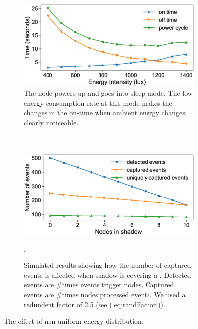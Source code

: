 \begin{figure}
	\begin{subfigure}{0.49\columnwidth}
		\includegraphics[width=\textwidth]{figures/BatterylessNodesDutyCycles_Sleep_mode}
		\caption{The node powers up and goes into sleep mode. The low energy consumption rate at this mode makes the changes in the on-time when ambient energy changes clearly noticeable. \\  \\ \\ }
		\label{fig:differentEnergyIntensity}
	\end{subfigure}\hfill
	\begin{subfigure}{0.49\columnwidth}
		\includegraphics[width=\textwidth]{figures/different_energy_intensity}
		\caption{Simulated results showing how the number of captured events is affected when shadow is covering a \cis. Detected events are \#times events trigger nodes. Captured events are \#times nodes processed events. We used a redundent factor of 2.5 (see (\ref{eq:randFactor}))}.
		\label{fig:sim:differentEnergyIntensity}
	\end{subfigure}
	\vspace{-0.3cm}
	\caption{The effect of non-uniform energy distribution.}
	\label{fig:pwrCycleVSEnergyIntensity}
\end{figure}

